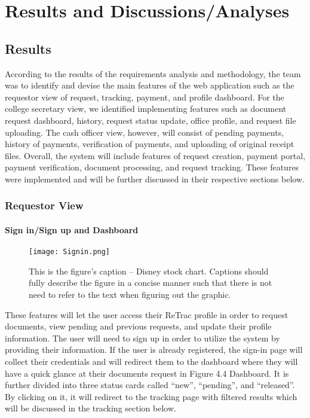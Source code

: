 
\chapter{Results and Discussions/Analyses}

\section{Results}

According to the results of the requirements analysis and methodology, the team was to identify and devise the main features of the web application such as the requestor view of request, tracking, payment, and profile dashboard. For the college secretary view, we identified implementing features such as document request dashboard, history, request status update, office profile, and request file uploading. The cash officer view, however, will consist of pending payments, history of payments, verification of payments, and uploading of original receipt files. Overall, the system will include features of request creation, payment portal, payment verification, document processing, and request tracking. These features were implemented and will be further discussed in their respective sections below.

\subsection{Requestor View}

\subsubsection{Sign in/Sign up and Dashboard}

\begin{figure}[t]
    \centering                    
    \texttt{[image: Signin.png]}
    \caption{This is the figure's caption -- Disney stock chart.
        Captions should fully describe the figure in a concise manner  such that there is not need to refer to the text when figuring out the graphic.}
     \label{fig:disneystock}
 \end{figure}

These features will let the user access their ReTrac profile in order to request documents, view pending and previous requests, and update their profile information. The user will need to sign up in order to utilize the system by providing their information. If the user is already registered, the sign-in page will collect their credentials and will redirect them to the dashboard where they will have a quick glance at their documents request in Figure 4.4 Dashboard. It is further divided into three status cards called “new”, “pending”, and “released”. By clicking on it, it will redirect to the tracking page with filtered results which will be discussed in the tracking section below.


